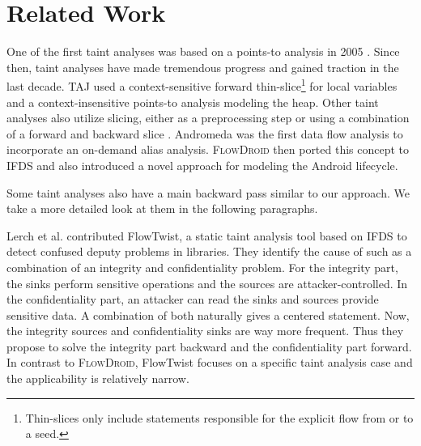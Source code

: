 \documentclass[../draft.tex]{subfiles}
\begin{document}
    \chapter{Related Work}\label{c:relatedwork}
    One of the first taint analyses was based on a points-to analysis in 2005 \cite{Livshits2005}. Since then, taint analyses have made tremendous progress and gained traction in the last decade.
    TAJ\cite{Tripp2009} used a context-sensitive forward thin-slice\footnote{Thin-slices only include statements responsible for the explicit flow from or to a seed.} for local variables and a context-insensitive points-to analysis modeling the heap.
    Other taint analyses also utilize slicing, either as a preprocessing step \cite{Zhao2020} or using a combination of a forward and backward slice \cite{Titze2015, Feichtner2018}.
    Andromeda\cite{Tripp2013} was the first data flow analysis to incorporate an on-demand alias analysis.
    \textsc{FlowDroid}\cite{Arzt2014} then ported this concept to IFDS and also introduced a novel approach for modeling the Android lifecycle.

    Some taint analyses also have a main backward pass similar to our approach. We take a more detailed look at them in the following paragraphs.

    Lerch et al.\cite{Lerch2014} contributed FlowTwist, a static taint analysis tool based on IFDS to detect confused deputy problems\footnotemark{} in libraries.
    They identify the cause of such as a combination of an integrity and confidentiality problem.
    For the integrity part, the sinks perform sensitive operations and the sources are attacker-controlled.
    In the confidentiality part, an attacker can read the sinks and sources provide sensitive data.
    A combination of both naturally gives a centered statement.
    Now, the integrity sources and confidentiality sinks are way more frequent.
    Thus they propose to solve the integrity part backward and the confidentiality part forward.
    In contrast to \textsc{FlowDroid}, FlowTwist focuses on a specific taint analysis case and the applicability is relatively narrow.
\end{document}
